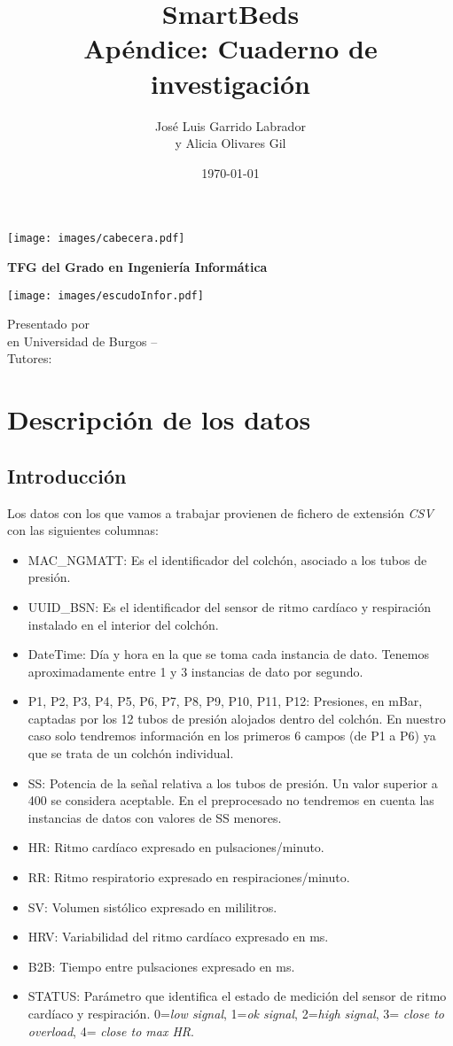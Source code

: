 \documentclass[a4paper,12pt,twoside,oldfontcommands]{memoir}
\title{{\Huge SmartBeds}\\[0.5cm]Apéndice: Cuaderno de investigación}
\date{\today}
\author{José Luis Garrido Labrador\\y Alicia Olivares Gil}
\makeatletter
\def\maketitle{
	\null
	\thispagestyle{empty}
	\noindent\texttt{[image: images/cabecera.pdf]}\vspace{1cm}%
	\vfill
	\colorbox{cpardoBox}{%
		\begin{minipage}{.8\textwidth}
			\vspace{.5cm}\Large
			\begin{center}
				\textbf{TFG del Grado en Ingeniería Informática}\vspace{.6cm}\\
				\textbf{\LARGE\@title{}}
			\end{center}
			\vspace{.2cm}
		\end{minipage}
		
	}%
	\hfill\begin{minipage}{.20\textwidth}
		\texttt{[image: images/escudoInfor.pdf]}
	\end{minipage}
	\vfill
	\begin{center}%
		{%
			\noindent\LARGE
			Presentado por \@author{}\\ 
			en Universidad de Burgos -- \@date{}\\
			Tutores: \@tutor{}\\
		}%
	\end{center}%
	\null
	\cleardoublepage
}
\makeatother
\begin{document}
	
	\maketitle
	
	\cleardoublepage
	
	\frontmatter
	
	\clearpage
	
	\tableofcontents
	
	\clearpage
	
	\listoffigures
	
	\clearpage
	
	\listoftables
	
	\clearpage
	
	\mainmatter
	
	\chapter{Descripción de los datos}
	\section{Introducción}
	Los datos con los que vamos a trabajar provienen de fichero de extensión \textit{CSV} con las siguientes columnas: 
	
	\begin{itemize}
		\item MAC\_NGMATT: Es el identificador del colchón, asociado a los tubos de presión.  
		\item UUID\_BSN: Es el identificador del sensor de ritmo cardíaco y respiración instalado en el interior del colchón. 
		\item DateTime: Día y hora en la que se toma cada instancia de dato. Tenemos aproximadamente entre 1 y 3 instancias de dato por segundo. 
		\item P1, P2, P3, P4, P5, P6, P7, P8, P9, P10, P11, P12: Presiones, en mBar, captadas por los 12 tubos de presión alojados dentro del colchón. En nuestro caso solo tendremos información en los primeros 6 campos (de P1 a P6) ya que se trata de un colchón individual. 
		\item SS: Potencia de la señal relativa a los tubos de presión. Un valor superior a 400 se considera aceptable. En el preprocesado no tendremos en cuenta las instancias de datos con valores de SS menores. 
		\item HR: Ritmo cardíaco expresado en pulsaciones/minuto. 
		\item RR: Ritmo respiratorio expresado en respiraciones/minuto.
		\item SV: Volumen sistólico expresado en mililitros.
		\item HRV: Variabilidad del ritmo cardíaco expresado en ms. 
		\item B2B: Tiempo entre pulsaciones expresado en ms. 
		\item STATUS: Parámetro que identifica el estado de medición del sensor de ritmo cardíaco y respiración. 0=\textit{low signal}, 1=\textit{ok signal}, 2=\textit{high signal}, 3= \textit{close to overload}, 4= \textit{close to max HR}. 
	\end{itemize}
	
\end{document}
